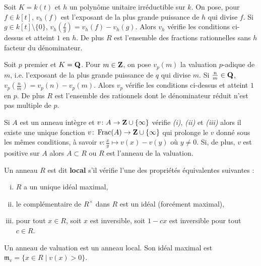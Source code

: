 	\begin{ex}
		Soit $K = k(t)$ et $h$ un polynôme unitaire irréductible sur $k$.
		On pose, pour $f \in k[t]$, $v_h(f)$ est l'exposant de la plus grande puissance de $h$ qui divise $f$.
		Si $g \in k[t] \setminus \{ 0 \}$, $v_h \left( \frac{f}{g} \right) = v_h(f) - v_h(g)$.
		Alors $v_h$ vérifie les conditions ci-dessus et atteint $1$ en $h$.
		De plus $R$ est l'ensemble des fractions rationnelles sans $h$ facteur du dénominateur.
	\end{ex}

	\begin{ex}
		Soit $p$ premier et $K = \mathbf{Q}$.
		Pour $m \in \mathbf{Z}$, on pose $v_p(m)$ la valuation $p$-adique de $m$, i.e. l'exposant de la plus grande puissance de $q$ qui divise $m$.
		Si $\frac{n}{m} \in \mathbf{Q}$, $v_p \left( \frac{n}{m} \right) = v_p(n) - v_p(m)$.
		Alors $v_p$ vérifie les conditions ci-dessus et atteint $1$ en $p$.
		De plus $R$ est l'ensemble des rationnels dont le dénominateur réduit n'est pas multiple de $p$.
	\end{ex}

	\begin{rem}
		Si $A$ est un anneau intègre et $v \colon A \to \mathbf{Z} \cup \{ \infty \}$ vérifie \textit{(i)}, \textit{(ii)} et \textit{(iii)} alors il existe une unique fonction $v \colon \operatorname{Frac}(A) \to \mathbf{Z} \cup \{ \infty \}$ qui prolonge le $v$ donné sous les mêmes conditions, à savoir $v \colon \frac{x}{y} \mapsto v(x) - v(y)$ où $y \neq 0$.
		Si, de plus, $v$ est positive sur $A$ alors $A \subset R$ ou $R$ est l'anneau de la valuation.
	\end{rem}

	\begin{defn}
		Un anneau $R$ est dit \textbf{local} s'il vérifie l'une des propriétés équivalentes suivantes :
		\begin{enumerate}[(i)]
			\item $R$ a un unique idéal maximal,
			\item le complémentaire de $R^\times$ dans $R$ est un idéal (forcément maximal),
			\item pour tout $x \in R$, soit $x$ est inversible, soit $1 - cx$ est inversible pour tout $c \in R$.
		\end{enumerate}
	\end{defn}
	
	\begin{pop}
		Un anneau de valuation est un anneau local.
		Son idéal maximal est $\mathfrak{m}_v = \{ x \in R \mid v(x) > 0 \}$.
	\end{pop}
	
